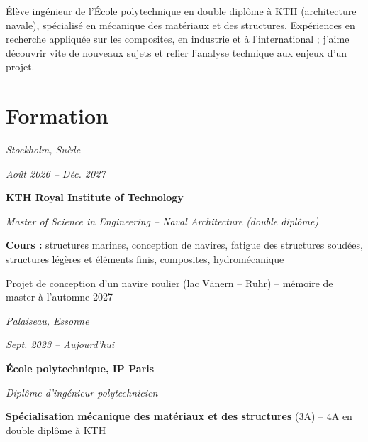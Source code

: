 \documentclass[10pt]{article}
\begin{document}

\begin{center}
    \small
    Élève ingénieur de l'École polytechnique en double diplôme à KTH (architecture navale), spécialisé en mécanique des matériaux et des structures. Expériences en recherche appliquée sur les composites, en industrie et à l'international ; j'aime découvrir vite de nouveaux sujets et relier l'analyse technique aux enjeux d'un projet.
\end{center}


\section{Formation}

    \begin{twocolentry}{
    \textit{Stockholm, Suède}

    \textit{Août 2026 – Déc. 2027}}
        \textbf{KTH Royal Institute of Technology}

        \textit{Master of Science in Engineering -- Naval Architecture (double diplôme)}
    \end{twocolentry}

    \bulletsep
    \begin{onecolentry}
        \begin{highlights}
            \item \textbf{Cours :} structures marines, conception de navires, fatigue des structures soudées, structures légères et éléments finis, composites, hydromécanique
            \item Projet de conception d'un navire roulier (lac Vänern -- Ruhr) -- mémoire de master à l'automne 2027
        \end{highlights}
    \end{onecolentry}

    \entrysep

    \begin{twocolentry}{
    \textit{Palaiseau, Essonne}

    \textit{Sept. 2023 – Aujourd'hui}}
        \textbf{École polytechnique, IP Paris}

        \textit{Diplôme d'ingénieur polytechnicien}
    \end{twocolentry}

    \bulletsep
    \begin{onecolentry}
        \begin{highlights}
            \item \textbf{Spécialisation mécanique des matériaux et des structures} (3A) -- 4A en double diplôme à KTH
        \end{highlights}
    \end{onecolentry}
\end{document}
